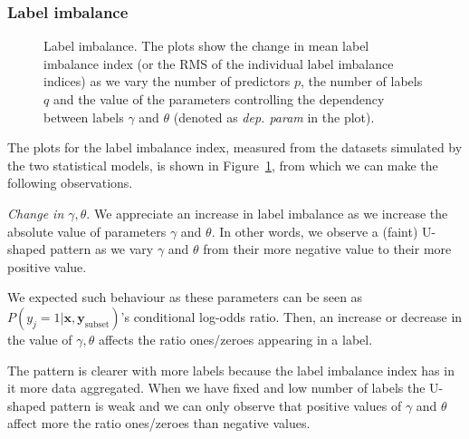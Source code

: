 \documentclass[review]{elsarticle}
\begin{document}
{		\subsubsection{Label imbalance}
		
		\begin{figure}[H]
			\begin{center}
			\end{center}
			\caption{Label imbalance. The plots show the change in mean label imbalance index (or the RMS of the individual label imbalance indices) as we vary the number of predictors $p$, the number of labels $q$ and the value of the parameters controlling the dependency between labels $\gamma$ and $\theta$ (denoted as \emph{dep. param} in the plot).}
			\label{fig:results:imb}
		\end{figure}
		
		The plots for the label imbalance index, measured from the datasets simulated by the two statistical models, is shown in Figure~\ref{fig:results:imb}, from which we can make the following observations.
		
		\emph{Change in $\gamma,\theta$}. We appreciate an increase in label imbalance as we increase the absolute value of parameters $\gamma$ and $\theta$. In other words, we observe a (faint) U-shaped pattern as we vary $\gamma$ and $\theta$ from their more negative value to their more positive value. 
		
		We expected such behaviour as these parameters can be seen as $P(y_{j}=1|\mathbf{x},\mathbf{y}_{\mathrm{subset}})$'s conditional log-odds ratio. Then, an increase or decrease in the value of $\gamma, \theta$ affects the ratio ones/zeroes appearing in a label. 
		
		The pattern is clearer with more labels because the label imbalance index has in it more data aggregated. When we have fixed and low number of labels the U-shaped pattern is weak and we can only observe that positive values of $\gamma$ and $\theta$ affect more the ratio ones/zeroes than negative values.
		
}
\end{document}

